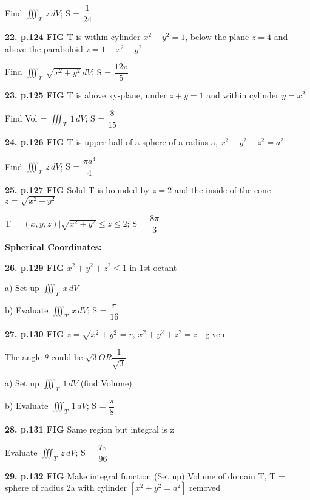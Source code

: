 \documentclass{article}
\begin{document}
Find $\iiint_T \ z \,dV$; {\color{blue}S = $\dfrac{1}{24}$}

\vspace{5mm}
\textbf{22. p.124 FIG} T is within cylinder \(x^2+y^2=1\), below the plane \(z=4\) and above the paraboloid \(z=1-x^2-y^2\)

Find $\iiint_T \ \sqrt{x^2+y^2} \,dV$; {\color{blue}S = $\dfrac{12\pi}{5}$}

\vspace{5mm}
\textbf{23. p.125 FIG} T is above xy-plane, under \(z+y=1\) and within cylinder \(y=x^2\) 

Find Vol = $\iiint_T \ 1 \,dV$; {\color{blue}S = $\dfrac{8}{15}$}

\vspace{5mm}
\textbf{24. p.126 FIG} T is upper-half of a sphere of a radius a, \(x^2+y^2+z^2=a^2\)

Find $\iiint_T \ z \,dV$; {\color{blue}S = $\dfrac{\pi a^4}{4}$}

\vspace{5mm}
\textbf{25. p.127 FIG} Solid T is bounded by \(z=2\) and the inside of the cone \(z=\sqrt{x^2+y^2}\)

T = \( {(x,y,z) | \sqrt{x^2+y^2} \leq z \leq 2} \); {\color{blue}S = $\dfrac{8\pi}{3}$}


\vspace{15mm}
{\Large \textbf{Spherical Coordinates:}}

\vspace{5mm}
\textbf{26. p.129 FIG} \(x^2+y^2+z^2 \leq 1\) in 1st octant

a) Set up $\iiint_T \ x \,dV$

b) Evaluate $\iiint_T \ x \,dV$; {\color{blue}S = $\dfrac{\pi}{16}$}


\vspace{5mm}
\textbf{27. p.130 FIG} \(z=\sqrt{x^2+y^2}=r\), \(x^2+y^2+z^2=z\) | given

The angle $\theta$ could be $\sqrt{3} OR \dfrac{1}{\sqrt{3}}$

a) Set up $\iiint_T \ 1 \,dV$ (find Volume)

b) Evaluate $\iiint_T \ 1 \,dV$; {\color{blue}S = $\dfrac{\pi}{8}$}

\vspace{5mm}
\textbf{28. p.131 FIG} Same region but integral is z

Evaluate $\iiint_T \ z \,dV$; {\color{blue}S = $\dfrac{7\pi}{96}$}

\vspace{5mm}
\textbf{29. p.132 FIG} Make integral function (Set up) Volume of domain T, T = sphere of radius 2a with cylinder \( [x^2+y^2=a^2] \) removed
\end{document}
